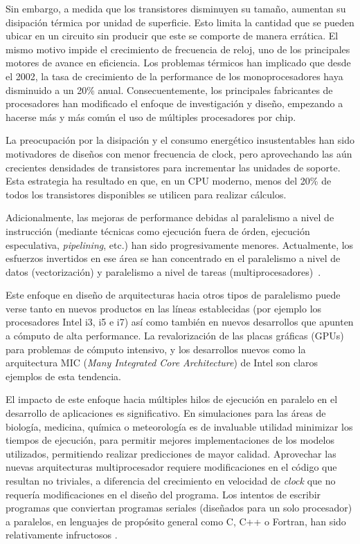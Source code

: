 Sin embargo, a medida que los transistores disminuyen su tama\~no, aumentan su disipaci\'on t\'ermica por unidad de superficie.
Esto limita la cantidad que se pueden ubicar en un circuito sin producir que este se comporte de manera err\'atica. 
El mismo motivo impide el crecimiento de frecuencia de reloj, uno de los principales motores de avance en eficiencia. 
Los problemas t\'ermicos han implicado que desde el 2002, la tasa de crecimiento de la performance de los monoprocesadores haya disminuido a un 20\% anual.
Consecuentemente, los principales fabricantes de procesadores han modificado el enfoque de investigaci\'on y dise\~no, empezando a hacerse m\'as y m\'as com\'un el uso de m\'ultiples procesadores por chip.

La preocupaci\'on por la disipaci\'on y el consumo energ\'etico insustentables han sido motivadores de dise\~nos con menor frecuencia de clock, pero aprovechando las a\'un crecientes densidades de transistores para incrementar las unidades de soporte. 
Esta estrategia ha resultado en que, en un CPU moderno, menos del 20\% de todos los transistores disponibles se utilicen para realizar c\'alculos.

Adicionalmente, las mejoras de performance debidas al paralelismo a nivel de instrucci\'on (mediante t\'ecnicas como ejecuci\'on fuera de \'orden, ejecuci\'on especulativa, \textit{pipelining}, etc.) han sido progresivamente menores. 
Actualmente, los esfuerzos invertidos en ese \'area se han concentrado en el paralelismo a nivel de datos (vectorizaci\'on) y paralelismo a nivel de tareas (multiprocesadores)~\cite{HennessyPatterson}.

Este enfoque en dise\~no de arquitecturas hacia otros tipos de paralelismo puede verse tanto en nuevos productos en las l\'ineas establecidas (por ejemplo los procesadores Intel i3, i5 e i7) as\'i como tambi\'en en nuevos desarrollos que apunten a c\'omputo de alta performance.
La revalorizaci\'on de las placas gr\'aficas (GPUs) para problemas de c\'omputo intensivo, y los desarrollos nuevos como la arquitectura MIC (\textit{Many Integrated Core Architecture}) de Intel son claros ejemplos de esta tendencia.

El impacto de este enfoque hacia m\'ultiples hilos de ejecuci\'on en paralelo en el desarrollo de aplicaciones es significativo. 
En simulaciones para las \'areas de biolog\'ia, medicina, qu\'imica o meteorolog\'ia es de invaluable utilidad minimizar los tiempos de ejecuci\'on, para permitir mejores implementaciones de los modelos utilizados, permitiendo realizar predicciones de mayor calidad. 
Aprovechar las nuevas arquitecturas multiprocesador requiere modificaciones en el c\'odigo que resultan no triviales, a diferencia del crecimiento en velocidad de \textit{clock} que no requer\'ia modificaciones en el dise\~no del programa. 
Los intentos de escribir programas que conviertan programas seriales (dise\~nados para un solo procesador) a paralelos, en lenguajes de prop\'osito general como C, C++ o Fortran, han sido relativamente infructosos .

